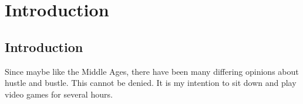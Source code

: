\chapter{Introduction}

\section{Introduction}
Since maybe like the Middle Ages, there have been many differing opinions about
hustle and bustle. This cannot be denied. It is my intention to sit down and
play video games for several hours.

%
%
